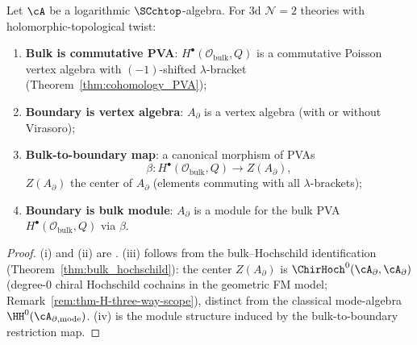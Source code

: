 \begin{theorem}
\label{thm:CDG_compatibility}
Let $\cA$ be a logarithmic $\SCchtop$-algebra.
For 3d $\mathcal{N}=2$ theories with holomorphic-topological twist:
\begin{enumerate}[label=(\roman*)]
\item \textbf{Bulk is commutative PVA}: $H^\bullet(\mathcal{O}_{\text{bulk}}, Q)$ is a commutative Poisson vertex algebra with $(-1)$-shifted $\lambda$-bracket (Theorem~\ref{thm:cohomology_PVA});

\item \textbf{Boundary is vertex algebra}: $A_{\partial}$ is a vertex algebra (with or without Virasoro);

\item \textbf{Bulk-to-boundary map}: a canonical morphism of PVAs
\begin{equation}
\beta : H^\bullet(\mathcal{O}_{\text{bulk}}, Q) \longrightarrow Z(A_{\partial}),
\end{equation}
$Z(A_{\partial})$ the center of $A_{\partial}$ (elements commuting with all $\lambda$-brackets);

\item \textbf{Boundary is bulk module}: $A_{\partial}$ is a module for the bulk PVA $H^\bullet(\mathcal{O}_{\text{bulk}}, Q)$ via $\beta$.
\end{enumerate}
\end{theorem}

\begin{proof}
(i) and (ii) are \cite[\S 4]{CDG20}. (iii) follows from the bulk--Hochschild identification (Theorem~\ref{thm:bulk_hochschild}): the center $Z(A_{\partial})$ is $\ChirHoch^0(\cA_\partial,\cA_\partial)$ (degree-$0$ chiral Hochschild cochains in the geometric FM model; Remark~\ref{rem:thm-H-three-way-scope}), distinct from the classical mode-algebra $\HH^0(\cA_{\partial,\mathrm{mode}})$. (iv) is the module structure induced by the bulk-to-boundary restriction map.
\end{proof}

